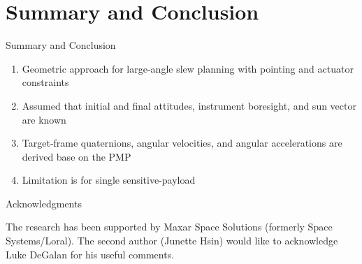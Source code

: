 \documentclass{beamer}
\begin{document}
\section{Summary and Conclusion}
\begin{frame}{Summary and Conclusion}
\begin{block}{}
	\begin{enumerate}
		\item Geometric approach for large-angle slew planning with pointing and actuator constraints 
		\item Assumed that initial and final attitudes, instrument boresight, and sun vector are known 
		\item Target-frame quaternions, angular velocities, and angular accelerations are derived base on the PMP 
		\item Limitation is for single sensitive-payload 
	\end{enumerate}
	
\end{block}
\end{frame}
\begin{frame}{Acknowledgments}
\begin{block}{}
	The research has been supported by Maxar Space Solutions (formerly Space Systems/Loral). The second author (Junette Hsin) would like to acknowledge Luke DeGalan for his useful comments. 
\end{block}
\end{frame}
%
%
%
\end{document}
